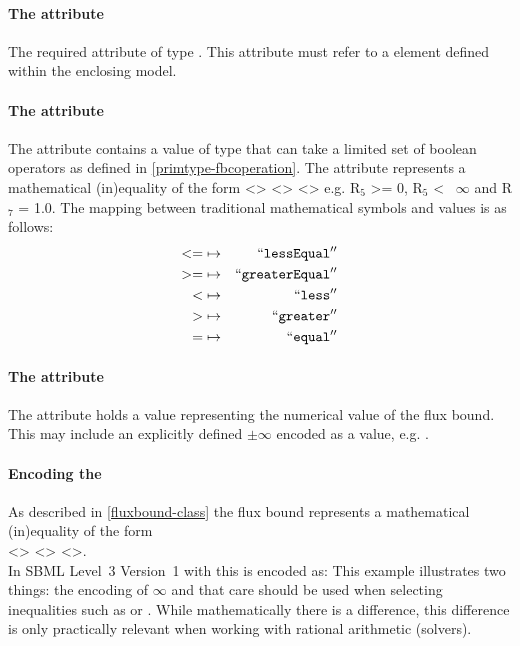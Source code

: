 \paragraph{The  attribute}
The required  attribute of type . This attribute must refer to a \Reaction element defined within the enclosing model.

\paragraph{The  attribute}
The  attribute contains a value of type
 that can take a limited set of boolean operators as
defined in \ref{primtype-fbcoperation}. The  attribute
represents a mathematical (in)equality of the form <>
<> <> e.g. R$_{5}$
>= 0, R$_{5}$ <~ $\infty$ and R$_{7}$ = 1.0. The mapping between traditional
mathematical symbols and  values is as follows:
\begin{eqnarray*}
\label{fb-operation-enum}
 \nonumber
  <= & \mapsto & ``\textcolor{black}{\textup{\ttfamily{lessEqual}}}''\\
  >= & \mapsto & ``\textcolor{black}{\textup{\ttfamily{greaterEqual}}}''\\
  < & \mapsto & ``\textcolor{black}{\textup{\ttfamily{less}}}''\\
  > & \mapsto & ``\textcolor{black}{\textup{\ttfamily{greater}}}''\\
  = & \mapsto & ``\textcolor{black}{\textup{\ttfamily{equal}}}''
\end{eqnarray*}

\paragraph{The  attribute}
The  attribute holds a  value representing the 
numerical value of the flux bound. This may include an explicitly defined
$\pm\infty$ encoded as a value, e.g. .

\paragraph{Encoding the \FluxBound}
As described in \ref{fluxbound-class} the flux bound represents a
mathematical (in)equality of the form\\ <> <>
<>.\\ In SBML Level~3 Version~1 with \FBC this is encoded as:
%
%
This example illustrates two things: the encoding of $\infty$ and that care
should be used when selecting inequalities such as  or
. While mathematically there is a difference, this difference
is only practically relevant when working with rational arithmetic
(solvers).

